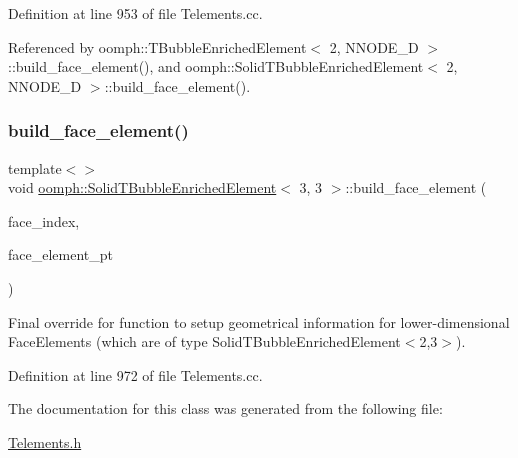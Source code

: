 Definition at line 953 of file Telements.\+cc.



Referenced by oomph\+::\+T\+Bubble\+Enriched\+Element$<$ 2, N\+N\+O\+D\+E\+\_\+D $>$\+::build\+\_\+face\+\_\+element(), and oomph\+::\+Solid\+T\+Bubble\+Enriched\+Element$<$ 2, N\+N\+O\+D\+E\+\_\+D $>$\+::build\+\_\+face\+\_\+element().

\mbox{\label{classoomph_1_1SolidTBubbleEnrichedElement_aa1dabe95e4bf687052640219350bd6f3}} 
\subsubsection{\texorpdfstring{build\+\_\+face\+\_\+element()}{build\_face\_element()}\hspace{0.1cm}{\footnotesize\ttfamily [2/2]}}
{\footnotesize\ttfamily template$<$$>$ \\
void \hyperlink{classoomph_1_1SolidTBubbleEnrichedElement}{oomph\+::\+Solid\+T\+Bubble\+Enriched\+Element}$<$ 3, 3 $>$\+::build\+\_\+face\+\_\+element (\begin{DoxyParamCaption}\item[{const int \&}]{face\+\_\+index,  }\item[{\hyperlink{classoomph_1_1FaceElement}{Face\+Element} $\ast$}]{face\+\_\+element\+\_\+pt }\end{DoxyParamCaption})}

Final override for function to setup geometrical information for lower-\/dimensional Face\+Elements (which are of type Solid\+T\+Bubble\+Enriched\+Element$<$2,3$>$). 

Definition at line 972 of file Telements.\+cc.



The documentation for this class was generated from the following file\+:\begin{DoxyCompactItemize}
\item 
\hyperlink{Telements_8h}{Telements.\+h}\end{DoxyCompactItemize}
